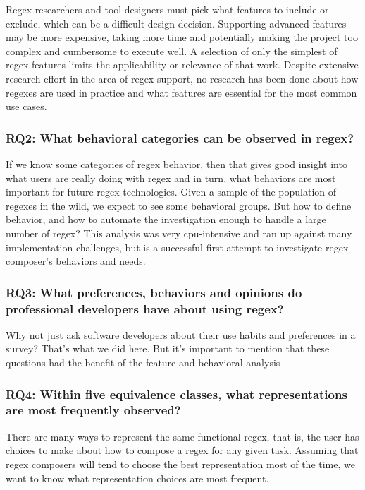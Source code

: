 Regex researchers and tool designers must pick what features to include or exclude, which  can be a difficult  design decision. Supporting advanced features may be more expensive, taking more time and potentially making the project too complex and cumbersome to execute well.  A selection of only the simplest of regex features limits the applicability or relevance of that work. Despite extensive research effort in the area of regex support,  no research has been done about how regexes are used in practice and what features are essential for the most common use cases.

\subsubsection{RQ2: What behavioral categories can be observed in regex?}
If we know some categories of regex behavior, then that gives good insight into what users are really doing with regex and in turn, what behaviors are most important for future regex technologies.  Given a sample of the population of regexes in the wild, we expect to see some behavioral groups.  But how to define behavior, and how to automate the investigation enough to handle a large number of regex?  This analysis was very cpu-intensive and ran up against many implementation challenges, but is a successful first attempt to investigate regex composer's behaviors and needs.

\subsubsection{RQ3: What preferences, behaviors and opinions do professional developers have about using regex?}

 Why not just ask software developers about their use habits and preferences in a survey?  That's what we did here.  But it's important to mention that these questions had the benefit of the feature and behavioral analysis



\subsubsection{RQ4: Within five equivalence classes, what representations are most frequently observed?}

There are many ways to represent the same functional regex, that is, the user has choices to make about how to compose a regex for any given task.  Assuming that regex composers will tend to choose the best representation most of the time, we want to know what representation choices are most frequent.

